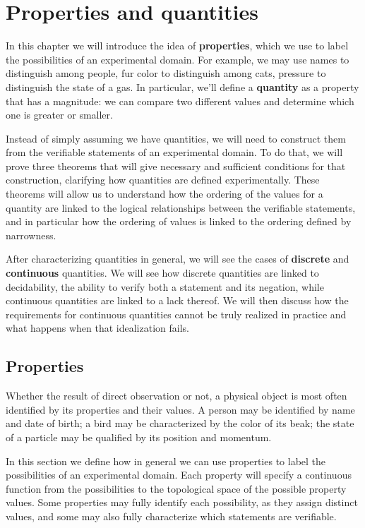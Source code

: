 \chapter{Properties and quantities}

In this chapter we will introduce the idea of \textbf{properties}, which we use to label the possibilities of an experimental domain. For example, we may use names to distinguish among people, fur color to distinguish among cats, pressure to distinguish the state of a gas. In particular, we'll define a \textbf{quantity} as a property that has a magnitude: we can compare two different values and determine which one is greater or smaller.

Instead of simply assuming we have quantities, we will need to construct them from the verifiable statements of an experimental domain. To do that, we will prove three theorems that will give necessary and sufficient conditions for that construction, clarifying how quantities are defined experimentally. These theorems will allow us to understand how the ordering of the values for a quantity are linked to the logical relationships between the verifiable statements, and in particular how the ordering of values is linked to the ordering defined by narrowness.

After characterizing quantities in general, we will see the cases of \textbf{discrete} and \textbf{continuous} quantities. We will see how discrete quantities are linked to decidability, the ability to verify both a statement and its negation, while continuous quantities are linked to a lack thereof. We will then discuss how the requirements for continuous quantities cannot be truly realized in practice and what happens when that idealization fails.

\section{Properties}

Whether the result of direct observation or not, a physical object is most often identified by its properties and their values. A person may be identified by name and date of birth; a bird may be characterized by the color of its beak; the state of a particle may be qualified by its position and momentum.

In this section we define how in general we can use properties to label the possibilities of an experimental domain. Each property will specify a continuous function from the possibilities to the topological space of the possible property values. Some properties may fully identify each possibility, as they assign distinct values, and some may also fully characterize which statements are verifiable.

